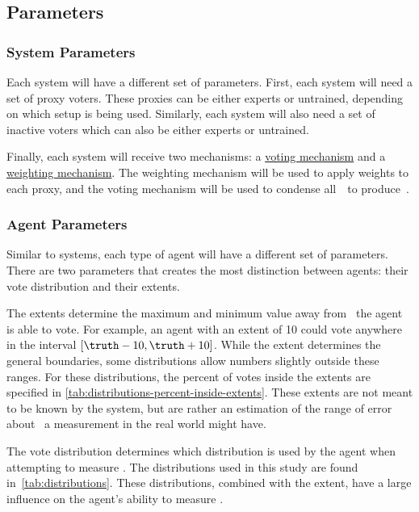 
\subsection{Parameters}\label{subsec:parameters}

\subsubsection{System Parameters}\label{subsubsec:system-parameters}
Each system will have a different set of parameters.
First, each system will need a set of proxy voters.
These proxies can be either experts or untrained, depending on which setup is
being used.
Similarly, each system will also need a set of inactive voters which can also
be either experts or untrained.

Finally, each system will receive two mechanisms: a
\hyperref[subsec:voting-mechanisms]{voting mechanism} and a
\hyperref[subsec:weighting-mechanisms]{weighting mechanism}.
The weighting mechanism will be used to apply weights to each proxy, and the
voting mechanism will be used to condense all~\agenttruth\ to
produce~\systemtruth.

\subsubsection{Agent Parameters}\label{subsubsec:agent-parameters}
Similar to systems, each type of agent will have a different set of parameters.
There are two parameters that creates the most distinction between
agents: their vote distribution and their extents.

The extents determine the maximum and minimum value away from \truth\ the
agent is able to vote.
For example, an agent with an extent of 10 could vote anywhere in the
interval $[\truth - 10, \truth + 10]$.
While the extent determines the general boundaries, some distributions allow
numbers slightly outside these ranges.
For these distributions, the percent of votes inside the extents are
specified in \autoref{tab:distributions-percent-inside-extents}.
These extents are not meant to be known by the system, but are rather an
estimation of the range of error about \truth\ a measurement in the real world
might have.

The vote distribution determines which distribution is used by the agent when
attempting to measure \truth.
The distributions used in this study are found
in~\autoref{tab:distributions}.
These distributions, combined with the extent, have a large influence on the
agent's ability to measure \truth.

